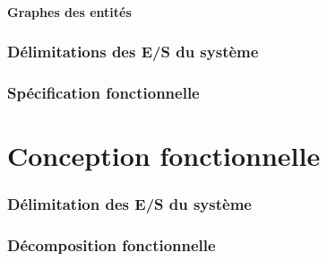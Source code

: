 \documentclass[11pt, french]{article} %
\begin{document}
\subsection{Graphes des entités}

\section{Délimitations des E/S du système}

\section{Spécification fonctionnelle}



\part{Conception fonctionnelle}
\section{Délimitation des E/S du système}
\section{Décomposition fonctionnelle}

%




%
%
\end{document}
